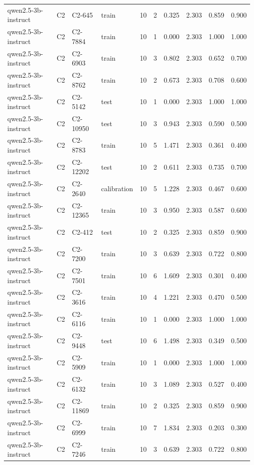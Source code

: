 \begin{table}
\begin{tabular}{llllrrrrrr}
qwen2.5-3b-instruct & C2 & C2-645 & train & 10 & 2 & 0.325 & 2.303 & 0.859 & 0.900 \\
qwen2.5-3b-instruct & C2 & C2-7884 & train & 10 & 1 & 0.000 & 2.303 & 1.000 & 1.000 \\
qwen2.5-3b-instruct & C2 & C2-6903 & train & 10 & 3 & 0.802 & 2.303 & 0.652 & 0.700 \\
qwen2.5-3b-instruct & C2 & C2-8762 & train & 10 & 2 & 0.673 & 2.303 & 0.708 & 0.600 \\
qwen2.5-3b-instruct & C2 & C2-5142 & test & 10 & 1 & 0.000 & 2.303 & 1.000 & 1.000 \\
qwen2.5-3b-instruct & C2 & C2-10950 & test & 10 & 3 & 0.943 & 2.303 & 0.590 & 0.500 \\
qwen2.5-3b-instruct & C2 & C2-8783 & train & 10 & 5 & 1.471 & 2.303 & 0.361 & 0.400 \\
qwen2.5-3b-instruct & C2 & C2-12202 & test & 10 & 2 & 0.611 & 2.303 & 0.735 & 0.700 \\
qwen2.5-3b-instruct & C2 & C2-2640 & calibration & 10 & 5 & 1.228 & 2.303 & 0.467 & 0.600 \\
qwen2.5-3b-instruct & C2 & C2-12365 & train & 10 & 3 & 0.950 & 2.303 & 0.587 & 0.600 \\
qwen2.5-3b-instruct & C2 & C2-412 & test & 10 & 2 & 0.325 & 2.303 & 0.859 & 0.900 \\
qwen2.5-3b-instruct & C2 & C2-7200 & train & 10 & 3 & 0.639 & 2.303 & 0.722 & 0.800 \\
qwen2.5-3b-instruct & C2 & C2-7501 & train & 10 & 6 & 1.609 & 2.303 & 0.301 & 0.400 \\
qwen2.5-3b-instruct & C2 & C2-3616 & train & 10 & 4 & 1.221 & 2.303 & 0.470 & 0.500 \\
qwen2.5-3b-instruct & C2 & C2-6116 & train & 10 & 1 & 0.000 & 2.303 & 1.000 & 1.000 \\
qwen2.5-3b-instruct & C2 & C2-9448 & test & 10 & 6 & 1.498 & 2.303 & 0.349 & 0.500 \\
qwen2.5-3b-instruct & C2 & C2-5909 & train & 10 & 1 & 0.000 & 2.303 & 1.000 & 1.000 \\
qwen2.5-3b-instruct & C2 & C2-6132 & train & 10 & 3 & 1.089 & 2.303 & 0.527 & 0.400 \\
qwen2.5-3b-instruct & C2 & C2-11869 & train & 10 & 2 & 0.325 & 2.303 & 0.859 & 0.900 \\
qwen2.5-3b-instruct & C2 & C2-6999 & train & 10 & 7 & 1.834 & 2.303 & 0.203 & 0.300 \\
qwen2.5-3b-instruct & C2 & C2-7246 & train & 10 & 3 & 0.639 & 2.303 & 0.722 & 0.800 \\

\end{tabular}
\end{table}
